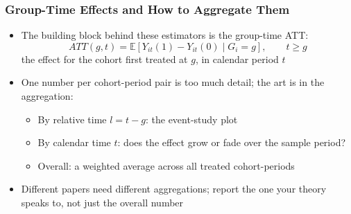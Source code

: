 \documentclass[xcolor=svgnames,9pt,english, aspectratio=169]{beamer}
\newcommand{\E}{\ensuremath{\mathbb{E}}}
\begin{document}
\begin{frame}
  \frametitle{Group-Time Effects and How to Aggregate Them}
\begin{itemize}[<+->]\itemsep0.9em
\item The building block behind these estimators is the \alert{group-time ATT}:
\begin{equation*}
ATT(g, t) = \E[Y_{it}(1) - Y_{it}(0) \mid G_i = g], \qquad t \geq g
\end{equation*}
the effect for the cohort first treated at $g$, in calendar period $t$
\item One number per cohort-period pair is too much detail; the art is in the \alert{aggregation}:
\begin{itemize}\itemsep0.5em
  \item By relative time $l = t - g$: the \alert{event-study} plot
  \item By calendar time $t$: does the effect grow or fade over the sample period?
  \item Overall: a weighted average across all treated cohort-periods
\end{itemize}
\item Different papers need different aggregations; report the one your theory speaks to, not just the overall number
\end{itemize}
\end{frame}
\end{document}
